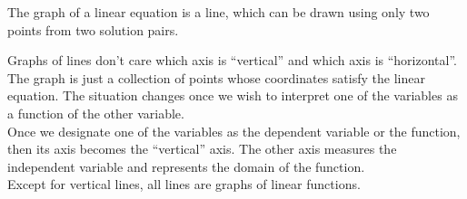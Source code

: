 \documentclass{ximera}
\begin{document}
\begin{example}
\begin{image}
\end{image}

The graph of a linear equation is a line, which can be drawn using only two points from two solution pairs.














\end{example}

Graphs of lines don't care which axis is ``vertical'' and which axis is ``horizontal''.  The graph is just a collection of points whose coordinates satisfy the linear equation.  The situation changes once we wish to interpret one of the variables as a function of the other variable. \\




Once we designate one of the variables as the dependent variable or the function, then its axis becomes the ``vertical'' axis.  The other axis measures the independent variable and represents the domain of the function. \\


Except for vertical lines, all lines are graphs of linear functions. \\
\end{document}
